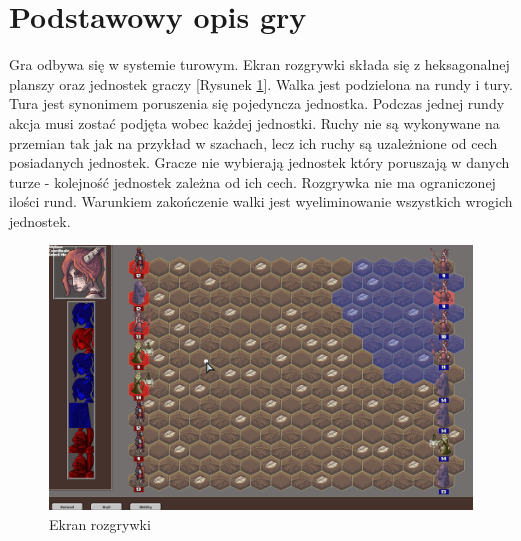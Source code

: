 \documentclass[letterpaper,12pt]{article}
\begin{document}
\section{Podstawowy opis gry}

Gra odbywa się w systemie turowym. Ekran rozgrywki składa się z heksagonalnej planszy oraz jednostek graczy [Rysunek \ref{fig:map}]. Walka jest podzielona na rundy i tury. Tura jest synonimem poruszenia się pojedyncza jednostka. Podczas jednej rundy akcja musi zostać podjęta wobec każdej jednostki. Ruchy nie są wykonywane na przemian tak jak na przykład w szachach, lecz ich ruchy są uzależnione od cech posiadanych jednostek. Gracze nie wybierają jednostek który poruszają w danych turze - kolejność jednostek zależna od ich cech. Rozgrywka nie ma ograniczonej ilości rund. Warunkiem zakończenie walki jest wyeliminowanie wszystkich wrogich jednostek.

\begin{figure}[H]
 \centering
  \includegraphics[width=6.2in]{hexmap1.png}
  \caption{Ekran rozgrywki}
  \label{fig:map}
\end{figure}
\end{document}
